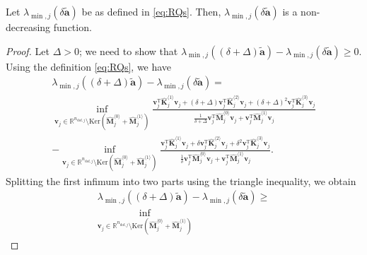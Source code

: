 \documentclass[final,onefignum,onetabnum]{siamart220329}
\newtheorem*{proof}{Proof}%
\begin{document}
\begin{proposition}\label{prop:monotonic}
Let $\lambda_{\min,j}(\delta \tilde{\mathbf{a}})$ be as defined in \eqref{eq:RQs}. Then, $\lambda_{\min,j}(\delta \tilde{\mathbf{a}})$ is a non-decreasing function.
\begin{proof}
Let $\Delta > 0$; we need to show that $\lambda_{\min,j}((\delta+\Delta) \tilde{\mathbf{a}}) - \lambda_{\min,j}(\delta \tilde{\mathbf{a}})\ge 0$. Using the definition \eqref{eq:RQs}, we have %
\begin{multline}
	\lambda_{\min,j}((\delta + \Delta)\tilde{\mathbf{a}}) - \lambda_{\min,j}(\delta \tilde{\mathbf{a}})=\\
	\inf_{\mathbf{v}_j \in \mathbb{R}^{n_{\mathrm{dof},j}}\setminus \mathrm{Ker}\left(\hat{\mathbf{M}}_j^{\langle 0\rangle}+\hat{\mathbf{M}}_j^{\langle 1\rangle}\right)} 
	\frac{\mathbf{v}_j^\mathrm{T} \hat{\mathbf{K}}_j^{\langle 1\rangle}\mathbf{v}_j + (\delta+\Delta) \mathbf{v}_j^\mathrm{T}\hat{\mathbf{K}}_j^{\langle 2\rangle} \mathbf{v}_j + (\delta+\Delta)^2 \mathbf{v}_j^\mathrm{T}\hat{\mathbf{K}}_j^{\langle 3\rangle} \mathbf{v}_j}{\frac{1}{\delta + \Delta }\mathbf{v}_j^\mathrm{T} \hat{\mathbf{M}}_j^{\langle 0\rangle} \mathbf{v}_j + \mathbf{v}_j^\mathrm{T} \hat{\mathbf{M}}_j^{\langle 1\rangle} \mathbf{v}_j} \\
	- \inf_{\mathbf{v}_j \in \mathbb{R}^{n_{\mathrm{dof},j}}\setminus \mathrm{Ker}\left(\hat{\mathbf{M}}_j^{\langle 0\rangle}+\hat{\mathbf{M}}_j^{\langle 1\rangle}\right)} \frac{\mathbf{v}_j^\mathrm{T} \hat{\mathbf{K}}_j^{\langle 1\rangle}\mathbf{v}_j + \delta \mathbf{v}_j^\mathrm{T}\hat{\mathbf{K}}_j^{\langle 2\rangle} \mathbf{v}_j + \delta^2 \mathbf{v}_j^\mathrm{T}\hat{\mathbf{K}}_j^{\langle 3\rangle} \mathbf{v}_j}{\frac{1}{\delta}\mathbf{v}_j^\mathrm{T} \hat{\mathbf{M}}_j^{\langle 0\rangle} \mathbf{v}_j + \mathbf{v}_j^\mathrm{T} \hat{\mathbf{M}}_j^{\langle 1\rangle} \mathbf{v}_j}.
\end{multline}
%
Splitting the first infimum into two parts using the triangle inequality, we obtain 
%
\begin{multline}\label{eq:lamdiff}
	\lambda_{\min,j}((\delta + \Delta)\tilde{\mathbf{a}}) - \lambda_{\min,j}(\delta \tilde{\mathbf{a}})\ge\\
	\inf_{\mathbf{v}_j \in \mathbb{R}^{n_{\mathrm{dof},j}}\setminus \mathrm{Ker}\left(\hat{\mathbf{M}}_j^{\langle 0\rangle}+\hat{\mathbf{M}}_j^{\langle 1\rangle}\right)} 

\end{multline}
\end{proof}
\end{proposition}
\end{document}
